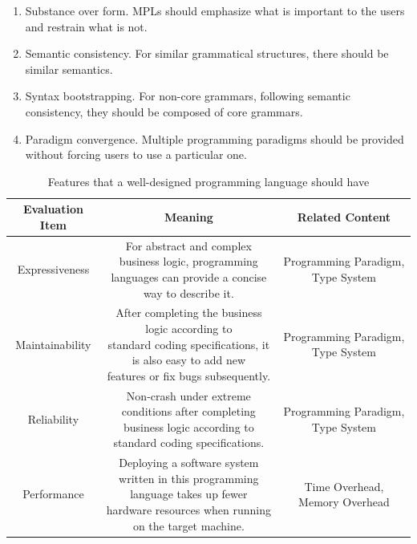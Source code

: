 \begin{enumerate}
    \item Substance over form. MPLs should emphasize what is important to the users and restrain what is not.
    \item Semantic consistency. For similar grammatical structures, there should be similar semantics.
    \item Syntax bootstrapping. For non-core grammars, following semantic consistency, they should be composed of core grammars.
    \item Paradigm convergence. Multiple programming paradigms should be provided without forcing users to use a particular one.
\end{enumerate}

\begin{table}[htb]
    \caption{Features that a well-designed programming language should have}
    \label{tab:evaluate}
    \begin{center}
        \begin{tabular}{ccc}
            \toprule
            Evaluation Item & Meaning & Related Content \\
            \midrule
            Expressiveness &
            \makecell[l]{
                For abstract and complex business logic, programming \\
                languages can provide a concise way to describe it.
            }
            & Programming Paradigm, Type System \\
            \midrule
            Maintainability &
            \makecell[l]{
                After completing the business logic according to \\
                standard coding specifications, it is also easy to add new \\ features or
                fix bugs subsequently.
            }
            & Programming Paradigm, Type System \\
            \midrule
            Reliability &
            \makecell[l]{
                Non-crash under extreme conditions after completing \\
                business logic according to standard coding specifications.
            }
            & Programming Paradigm, Type System \\
            \midrule
            Performance &
            \makecell[l]{
                Deploying a software system written in this programming \\
                language takes up fewer hardware resources when running \\ on the target
                machine.
            }
            & Time Overhead, Memory Overhead \\
            \bottomrule
        \end{tabular}
    \end{center}
\end{table}

